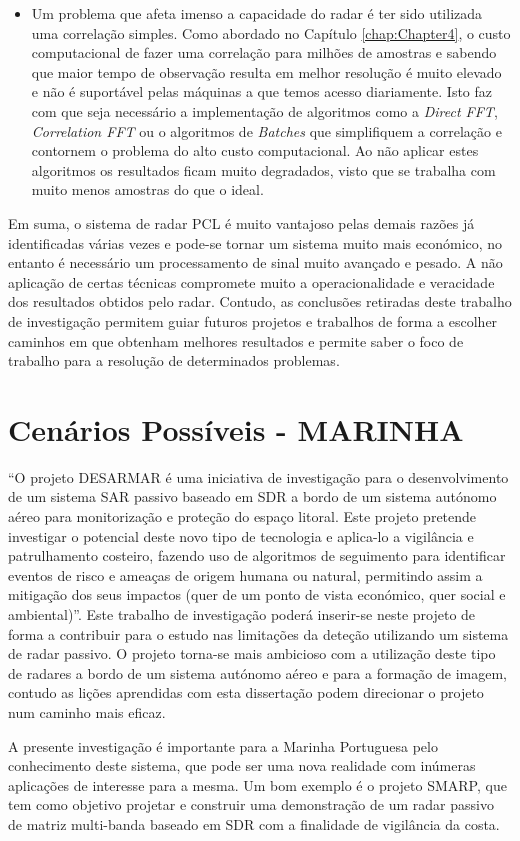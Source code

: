 \begin{itemize}
\item Um problema que afeta imenso a capacidade do radar é ter sido utilizada uma correlação simples. Como abordado no Capítulo \ref{chap:Chapter4}, o custo computacional de fazer uma correlação para milhões de amostras e sabendo que maior tempo de observação resulta em melhor resolução é muito elevado e não é suportável pelas máquinas a que temos acesso diariamente. Isto faz com que seja necessário a implementação de algoritmos como a \textit{Direct FFT}, \textit{Correlation FFT} ou o algoritmos de \textit{Batches} que simplifiquem a correlação e contornem o problema do alto custo computacional. Ao não aplicar estes algoritmos os resultados ficam muito degradados, visto que se trabalha com muito menos amostras do que o ideal.


\end{itemize}


Em suma, o sistema de radar \gls{PCL} é muito vantajoso pelas demais razões já identificadas várias vezes e pode-se tornar um sistema muito mais económico, no entanto é necessário um processamento de sinal muito avançado e pesado. A não aplicação de certas técnicas compromete muito a operacionalidade e veracidade dos resultados obtidos pelo radar. Contudo, as conclusões retiradas deste trabalho de investigação permitem guiar futuros projetos e trabalhos de forma a escolher caminhos em que obtenham melhores resultados e permite saber o foco de trabalho para a resolução de determinados problemas.


\section{Cenários Possíveis - MARINHA}
“O projeto DESARMAR é uma iniciativa de investigação para o desenvolvimento de um sistema \gls{SAR} passivo baseado em \gls{SDR} a bordo de um sistema autónomo aéreo para monitorização e proteção do espaço litoral. Este projeto pretende investigar o potencial deste novo tipo de tecnologia e aplica-lo a vigilância e patrulhamento costeiro, fazendo uso de algoritmos de seguimento para identificar eventos de risco e ameaças de origem humana ou natural, permitindo assim a mitigação dos seus impactos (quer de um ponto de vista económico, quer social e ambiental)”. Este trabalho de investigação poderá inserir-se neste projeto de forma a contribuir para o estudo nas limitações da deteção utilizando um sistema de radar passivo. O projeto torna-se mais ambicioso com a utilização deste tipo de radares a bordo de um sistema autónomo aéreo e para a formação de imagem, contudo as lições aprendidas com esta dissertação podem direcionar o projeto num caminho mais eficaz.\par
A presente investigação é importante para a Marinha Portuguesa pelo conhecimento deste sistema, que pode ser uma nova realidade com inúmeras aplicações de interesse para a mesma. Um bom exemplo é o projeto \gls{SMARP}, que tem como objetivo projetar e construir uma demonstração de um radar passivo de matriz multi-banda baseado em \gls{SDR} com a finalidade de vigilância da costa.


